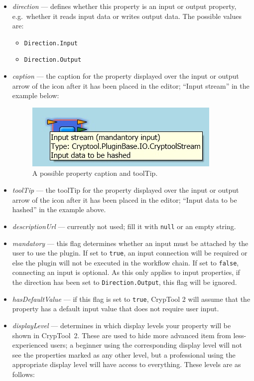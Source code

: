 \begin{itemize}
	\item \textit{direction} --- defines whether this property is an input or output property, e.g.\ whether it reads input data or writes output data. The possible values are:
	\begin{itemize}
		\item \texttt{Direction.Input}
		\item \texttt{Direction.Output}
	\end{itemize}
	\item \textit{caption} --- the caption for the property displayed over the input or output arrow of the icon after it has been placed in the editor; ``Input stream'' in the example below:
	
\begin{figure}[h!]
	\centering
		\includegraphics[width=.55\textwidth]{figures/property_caption.jpg}
	\caption{A possible property caption and toolTip.}
	\label{fig:property_caption}
\end{figure}

	\item \textit{toolTip} --- the toolTip for the property displayed over the input or output arrow of the icon after it has been placed in the editor; ``Input data to be hashed'' in the example above.
	\item \textit{descriptionUrl} --- currently not used; fill it with \texttt{null} or an empty string.
	\item \textit{mandatory} --- this flag determines whether an input must be attached by the user to use the plugin. If set to \texttt{true}, an input connection will be required or else the plugin will not be executed in the workflow chain. If set to \texttt{false}, connecting an input is optional. As this only applies to input properties, if the direction has been set to \texttt{Direction.Output}, this flag will be ignored.
	\item \textit{hasDefaultValue} --- if this flag is set to \texttt{true}, CrypTool 2 will assume that the property has a default input value that does not require user input.
	\item \textit{displayLevel} --- determines in which display levels your property will be shown in CrypTool~2. These are used to hide more advanced item from less-experienced users; a beginner using the corresponding display level will not see the properties marked as any other level, but a professional using the appropriate display level will have access to everything. These levels are as follows:
	

\end{itemize}
